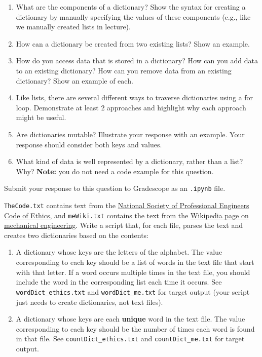 \documentclass{homework}
\begin{document}
\begin{enumerate}

    \item What are the components of a dictionary? Show the syntax for creating a dictionary by manually specifying the values of these components (e.g., like we manually created lists in lecture).

    \item How can a dictionary be created from two existing lists? Show an example.

    \item How do you access data that is stored in a dictionary? How can you add data to an existing dictionary? How can you remove data from an existing dictionary? Show an example of each.

    \item Like lists, there are several different ways to traverse dictionaries using a for loop. Demonstrate at least 2 approaches and highlight why each approach might be useful.

    \item Are dictionaries mutable? Illustrate your response with an example. Your response should consider both keys and values.

    \item What kind of data is well represented by a dictionary, rather than a list? Why? \textbf{Note:} you do not need a code example for this question.

\end{enumerate}

Submit your response to this question to Gradescope as an \texttt{.ipynb} file.

\newpage

\newpage
{}

\texttt{TheCode.txt} contains text from the \href{https://www.nspe.org/resources/ethics/code-ethics}{National Society of Professional Engineers Code of Ethics}, and \texttt{meWiki.txt} contains the text from the \href{https://en.wikipedia.org/wiki/Mechanical_engineering}{Wikipedia page on mechanical engineering}. Write a script that, for each file, parses the text and creates two dictionaries based on the contents:
\begin{enumerate}
    \item A dictionary whose keys are the letters of the alphabet. The value corresponding to each key should be a list of words in the text file that start with that letter. If a word occurs multiple times in the text file, you should include the word in the corresponding list each time it occurs. See \texttt{wordDict\_ethics.txt} and \texttt{wordDict\_me.txt} for target output (your script just needs to create dictionaries, not text files).
    \item A dictionary whose keys are each \textbf{unique} word in the text file. The value corresponding to each key should be the number of times each word is found in that file. See \texttt{countDict\_ethics.txt} and \texttt{countDict\_me.txt} for target output.
\end{enumerate}
\end{document}
